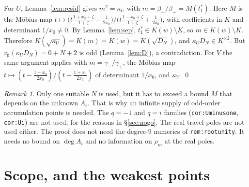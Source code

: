 \documentclass[11pt]{article}
\theoremstyle{remark}
\newtheorem{remark}[theorem]{Remark}
\begin{document}
For $U$, Lemma~\ref{lem:resid} gives $m^2=\kappa_U$ with $m=\beta_-/\beta_+=M(t_1^\ast)$. Here $M$ is the
M\"obius map $t\mapsto\bigl(t\frac{1+x_0+\zeta}{1+\zeta}-\frac1{2x_0}\bigr)/\bigl(t\frac{1-x_0+\zeta}{1+\zeta}+\frac1{2x_0}\bigr)$,
with coefficients in $K$ and determinant $1/x_0\ne0$. By Lemma~\ref{lem:sep}, $t_1^\ast\in K(w)\setminus K$,
so $m\in K(w)\setminus K$. Therefore $K(\sqrt{\kappa_U})=K(m)=K(w)=K(\sqrt{D_N})$, and $\kappa_UD_N\in K^{\times2}$.
But $v_{\mathfrak p}(\kappa_UD_N)=0+N+2$ is odd (Lemma~\ref{lem:D}), a contradiction.
For $V$ the same argument applies with $m=\gamma_-/\gamma_+$, the M\"obius map
$t\mapsto(t-\frac{1-x_0}{2x_0})/(t+\frac{1+x_0}{2x_0})$ of determinant $1/x_0$, and $\kappa_V$. \qed

\begin{remark}
Only one suitable $N$ is used, but it has to exceed a bound $M$ that depends on the unknown $A_i$. That is
why an infinite supply of odd-order accumulation points is needed. The $q=-1$ and $q=i$ families
(\texttt{cor:Uminusone}, \texttt{cor:Ui}) are not used, for the reasons in \S\ref{sec:nogo}. The real travel
poles are not used either. The proof does not need the degree-$9$ numerics of \texttt{rem:rootunity}. It
needs no bound on $\deg A_i$ and no information on $\rho_m$ at the real poles.
\end{remark}

\section{Scope, and the weakest points}
\end{document}
